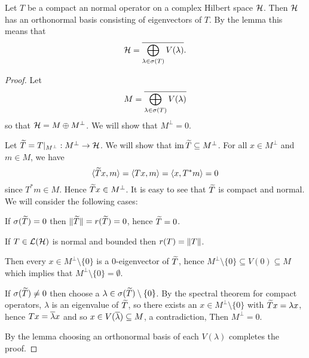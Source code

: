 \begin{thm}
  Let $T$ be a compact an normal operator on a complex Hilbert space $\mathcal{H}$.
  Then $\mathcal{H}$ has an orthonormal basis consisting of eigenvectors of $T$.
  By the lemma this means that
  \[ \mathcal{H} = \overline{ \bigoplus_{\lambda \in \sigma(T)} V(\lambda) }. \]
\end{thm}

\begin{proof}
  Let
  \[ M = \overline{ \bigoplus_{\lambda \in \sigma(T)} V(\lambda) } \]
  so that $\mathcal{H} = M \oplus M^\perp$.
  We will show that $M^\perp=0$.

  Let $\widetilde T = T|_{M^\perp}: M^\perp \to \mathcal{H}$.
  We will show that $\operatorname{im}\widetilde T \subseteq M^\perp$.
  For all $x \in M^\perp$ and $m \in M$, we have
  \[ \langle\widetilde Tx,m\rangle = {\left\langle Tx,m \right\rangle} = {\left\langle x,T^*m \right\rangle} = 0 \]
  since $T^*m \in M$.
  Hence $\widetilde Tx \in M^\perp$.
  It is easy to see that $\widetilde T$ is compact and normal.
  We will consider the following cases:
  \begin{enum}
    \io
    If $\sigma(\widetilde T) = 0$ then $\Vert \widetilde T \Vert = r(\widetilde T) = 0$, hence $\widetilde T = 0$.
    \begin{exer}
      If $T \in \mathcal{L}(\mathcal{H})$ is normal and bounded then $r(T) = \left\lVert T \right\rVert$.
    \end{exer}
    Then every $x \in M^\perp \setminus \{0\}$ is a $0$-eigenvector of $\widetilde T$, hence $M^\perp \setminus \{0\} \subseteq V(0) \subseteq M$ which implies that $M^\perp \setminus \{0\} = \emptyset$.

    \io
    If $\sigma(\widetilde T) \neq 0$ then choose a $\lambda \in \sigma(\widetilde T) \setminus \{0\}$.
    By the spectral theorem for compact operators, $\lambda$ is an eigenvalue of $\widetilde T$, so there exists an $x \in M^\perp \setminus \{0\}$ with $\widetilde Tx = \lambda x$, hence $Tx = \overline\lambda x$ and so $x \in V(\overline\lambda) \subseteq M$, a contradiction, Then $M^\perp = 0$.
  \end{enum}
  By the lemma choosing an orthonormal basis of each $V(\lambda)$ completes the proof.
\end{proof}
